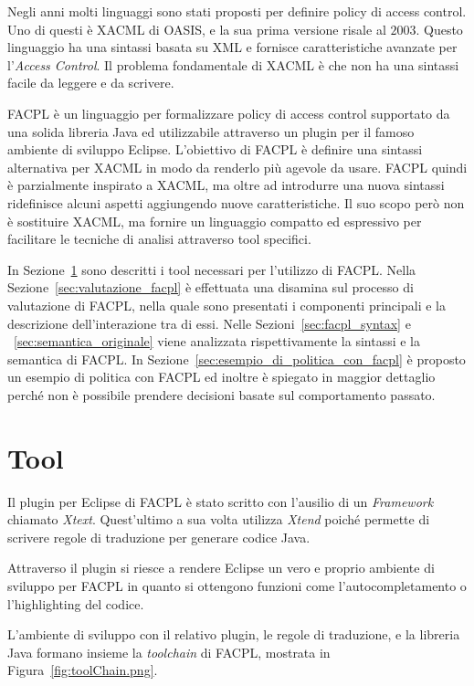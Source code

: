 \label{cap:facpl}
Negli anni molti linguaggi sono stati proposti per definire policy di access control. Uno di questi è \acf{XACML} di OASIS, e la sua prima versione risale al $2003$. Questo linguaggio ha una sintassi basata su \ac{XML} e fornisce caratteristiche avanzate per l'\textit{Access Control}. Il problema fondamentale di \ac{XACML} è che non ha una sintassi facile da leggere e da scrivere. \par
\acf{FACPL} è un linguaggio per formalizzare policy di access control supportato da una solida libreria Java ed utilizzabile attraverso un plugin per il famoso ambiente di sviluppo Eclipse.
L'obiettivo di \ac{FACPL} è definire una sintassi alternativa per \ac{XACML} in modo da renderlo più agevole da usare.
\ac{FACPL} quindi è parzialmente inspirato a \ac{XACML}, ma oltre ad introdurre una nuova sintassi ridefinisce alcuni aspetti aggiungendo nuove caratteristiche. Il suo scopo però non è sostituire \ac{XACML}, ma fornire un linguaggio compatto ed espressivo per facilitare le tecniche di analisi attraverso tool specifici.\par
In Sezione~\ref{sec:tool} sono descritti i tool necessari per l'utilizzo di 
\ac{FACPL}.
Nella Sezione~\ref{sec:valutazione_facpl} è effettuata una disamina sul processo di valutazione di \ac{FACPL}, nella quale sono presentati i componenti principali e la descrizione dell'interazione tra di essi.
Nelle Sezioni~\ref{sec:facpl_syntax} e ~\ref{sec:semantica_originale} viene analizzata rispettivamente la sintassi e la semantica di \ac{FACPL}.
In Sezione~\ref{sec:esempio_di_politica_con_facpl} è proposto un esempio di politica con \ac{FACPL} ed inoltre è spiegato in maggior dettaglio perché non è possibile prendere decisioni basate sul comportamento passato.

\section{Tool}
\label{sec:tool}
Il plugin per Eclipse di \ac{FACPL} è stato scritto con l'ausilio di un \textit{Framework} chiamato \textit{Xtext}. Quest'ultimo a sua volta utilizza \textit{Xtend} poiché permette di scrivere regole di traduzione per generare codice Java.\par
Attraverso il plugin si riesce a rendere Eclipse un vero e proprio ambiente di sviluppo per \ac{FACPL} in quanto si ottengono funzioni come l'autocompletamento o l'highlighting del codice.\par
L'ambiente di sviluppo con il relativo plugin, le regole di traduzione, e la libreria Java formano insieme la \textit{toolchain} di \ac{FACPL}, mostrata in Figura~\ref{fig:toolChain.png}.


